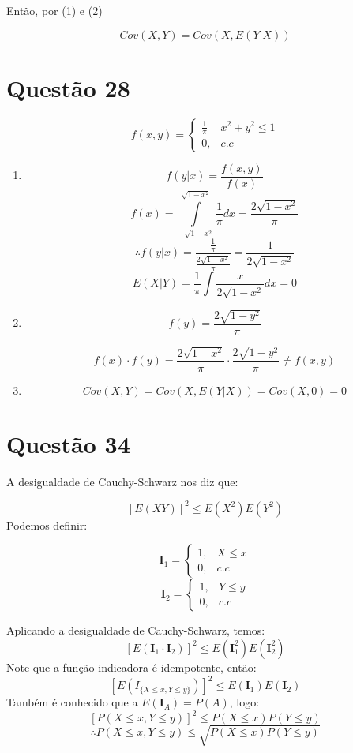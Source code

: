 \documentclass[a4paper,12pt]{report}
\begin{document}
Então, por (1) e (2)

$$Cov(X,Y) = Cov(X,E(Y|X)) $$

\section{Questão 28}
$$f(x,y)=\begin{cases}
\frac{1}{\pi} & x^2+y^2\le 1\\
0, & c.c
\end{cases} $$

\begin{enumerate}[label=\alph*)]
	\item $$f(y|x) = \frac{f(x,y)}{f(x)} $$
	$$f(x) = \int\limits_{-\sqrt{1-x^2}}^{\sqrt{1-x^2}} \frac{1}{\pi} dx =\frac{2 \sqrt{1-x^2}}{\pi }$$
	$$\therefore  f(y|x) = \frac{\frac{1}{\pi}}{\frac{2 \sqrt{1-x^2}}{\pi }}= \frac{1}{2 \sqrt{1-x^2}}$$
	$$E(X|Y) = \frac{1}{\pi}\int\limits \frac{x}{2 \sqrt{1-x^2}}dx = 0$$
	\item 
	$$f(y) = \frac{2\sqrt{1-y^2}}{\pi} $$
	
	$$f(x)\cdot f(y) =\frac{2\sqrt{1-x^2}}{\pi} \cdot \frac{2\sqrt{1-y^2}}{\pi} \ne f(x,y)  $$
	\item 
	$$Cov(X,Y) = Cov(X,E(Y|X)) = Cov(X,0)= 0 $$
\end{enumerate}
\newpage 

\section{Questão 34}
A desigualdade de Cauchy-Schwarz nos diz que:

$$[E(XY)]^2\le E(X^2)E(Y^2)  $$
Podemos definir:


$$\mathbf I_1=\begin{cases}
1, & X\le x\\
0, & c.c
\end{cases} $$
$$\mathbf I_2=\begin{cases}
1, &Y\le y\\
0, & c.c
\end{cases} $$

Aplicando a desigualdade de Cauchy-Schwarz, temos:
$$[E(\mathbf I_1\cdot \mathbf I_2)]^2 \le E(\mathbf I_1^2)E(\mathbf I_2^2) $$
Note que a função indicadora é idempotente, então:
$$[E(I_{\{X\le x,Y\le y\}})]^2 \le E(\mathbf I_1)E(\mathbf I_2) $$
Também é conhecido que a $E(\mathbf I_A) = P(A)$, logo:
$$[P(X\le x, Y\le y)]^2 \le P(X\le x)P(Y\le y) $$
$$\therefore P(X\le x, Y\le y) \le \sqrt{ P(X\le x)P(Y\le y) } $$
\newpage 
\end{document}
